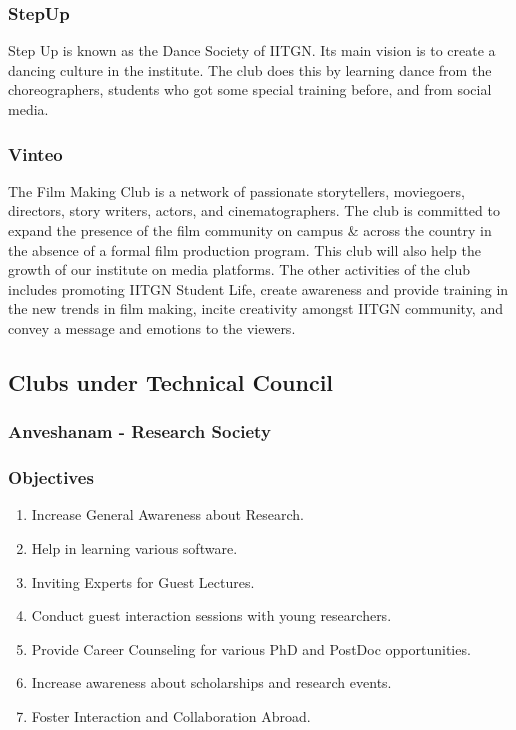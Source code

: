\documentclass[12pt]{article}
\begin{document}
\subsubsection{StepUp}
Step Up is known as the Dance Society of IITGN. Its main vision is to create a dancing culture in the institute. The club does this by learning dance from the choreographers, students who got some special training before, and from social media.

\subsubsection{Vinteo}
The Film Making Club is a network of passionate storytellers, moviegoers, directors, story writers, actors, and cinematographers. The club is committed to expand the presence of the film community on campus \& across the country in the absence of a formal film production program. This club will also help the growth of our institute on media platforms. The other activities of the club includes promoting IITGN Student Life, create awareness and provide training in the new trends in film making, incite creativity amongst IITGN community, and convey a message and emotions to the viewers.

\newpage
\subsection{Clubs under Technical Council} \label{Clubs under Technical Council}

\subsubsection{Anveshanam - Research Society}
\subsubsection*{Objectives}
\begin{enumerate}
    \item Increase General Awareness about Research.
    \item Help in learning various software.
    \item Inviting Experts for Guest Lectures.
    \item Conduct guest interaction sessions with young researchers.
    \item Provide Career Counseling for various PhD and PostDoc opportunities.
    \item Increase awareness about scholarships and research events.
    \item Foster Interaction and Collaboration Abroad.
\end{enumerate}
\end{document}
